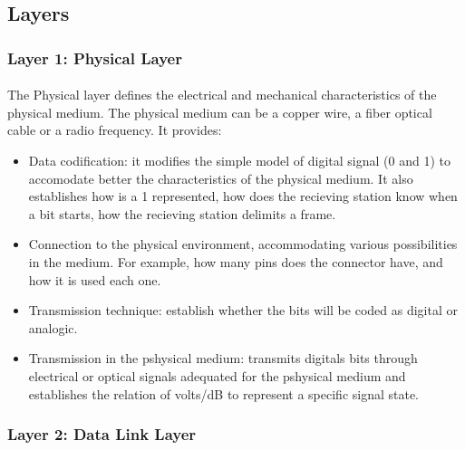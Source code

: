 \documentclass[12pt,a4paper]{report}
\begin{document}
\subsection{Layers}

\subsubsection{Layer 1: Physical Layer}
\paragraph{}The Physical layer defines the electrical and mechanical characteristics of the physical medium. The physical medium can be a copper wire, a fiber optical cable or a radio frequency. It provides:
\begin{itemize}
\item Data codification: it modifies the simple model of digital signal (0 and 1) to accomodate better the characteristics of the physical medium. It also establishes how is a 1 represented, how does the recieving station know when a bit starts, how the recieving station delimits a frame.
\item Connection to the physical environment, accommodating various possibilities in the medium. For example, how many pins does the connector have, and how it is used each one.
\item Transmission technique: establish whether the bits will be coded as digital or analogic.
\item Transmission in the pshysical medium: transmits digitals bits through electrical or optical signals adequated for the pshysical medium and establishes the relation of volts/dB to represent a specific signal state.
\end{itemize}

\subsubsection{Layer 2: Data Link Layer}
\end{document}
